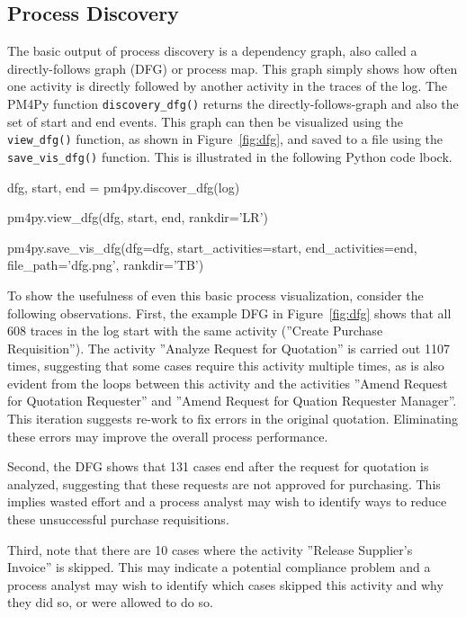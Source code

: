 \subsection*{Process Discovery}

The basic output of process discovery is a dependency graph, also called a directly-follows graph (DFG) or process map. This graph simply shows how often one activity is directly followed by another activity in the traces of the log. The PM4Py function \texttt{discovery\_dfg()} returns the directly-follows-graph and also the set of start and end events. This graph can then be visualized using the \texttt{view\_dfg()} function, as shown in Figure~\ref{fig:dfg}, and saved to a file using the \texttt{save\_vis\_dfg()} function. This is illustrated in the following Python code lbock.

\begin{samepage}
\begin{pythoncode}
dfg, start, end = pm4py.discover_dfg(log)

pm4py.view_dfg(dfg, start, end, rankdir='LR')

pm4py.save_vis_dfg(dfg=dfg,
    start_activities=start, end_activities=end, 
    file_path='dfg.png', rankdir='TB')
\end{pythoncode}
\end{samepage}

To show the usefulness of even this basic process visualization, consider the following observations. First, the example DFG in Figure~\ref{fig:dfg} shows that all 608 traces in the log start with the same activity (''Create Purchase Requisition''). The activity ''Analyze Request for Quotation'' is carried out 1107 times, suggesting that some cases require this activity multiple times, as is also evident from the loops between this activity and the activities ''Amend Request for Quotation Requester'' and ''Amend Request for Quation Requester Manager''. This iteration suggests re-work to fix errors in the original quotation. Eliminating these errors may improve the overall process performance. 

Second, the DFG shows that 131 cases end after the request for quotation is analyzed, suggesting that these requests are not approved for purchasing. This implies wasted effort and a process analyst may wish to identify ways to reduce these unsuccessful purchase requisitions. 

Third, note that there are 10 cases where the activity ''Release Supplier's Invoice'' is skipped. This may indicate a potential compliance problem and a process analyst may wish to identify which cases skipped this activity and why they did so, or were allowed to do so.

